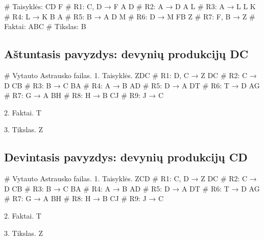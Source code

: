 \begin{pythonaienv}[fc]
# Taisyklės:
CD F                                    # R1: C, D → F
A D                                     # R2: A → D
A L                                     # R3: A → L
L K                                     # R4: L → K
B A                                     # R5: B → A
D M                                     # R6: D → M
FB Z                                    # R7: F, B → Z
# Faktai:
ABC
# Tikslas:
B
\end{pythonaienv}

\subsection{Aštuntasis pavyzdys: devynių produkcijų DC}

\begin{pythonaienv}[fc]
# Vytauto Astrausko failas.
1. Taisyklės.
ZDC                                     # R1: D, C → Z
DC                                      # R2: C → D
CB                                      # R3: B → C
BA                                      # R4: A → B
AD                                      # R5: D → A
DT                                      # R6: T → D
AG                                      # R7: G → A
BH                                      # R8: H → B
CJ                                      # R9: J → C

2. Faktai.
T

3. Tikslas.
Z
\end{pythonaienv}

\subsection{Devintasis pavyzdys: devynių produkcijų CD}

\begin{pythonaienv}[fc]
# Vytauto Astrausko failas.
1. Taisyklės.
ZCD                                     # R1: C, D → Z
DC                                      # R2: C → D
CB                                      # R3: B → C
BA                                      # R4: A → B
AD                                      # R5: D → A
DT                                      # R6: T → D
AG                                      # R7: G → A
BH                                      # R8: H → B
CJ                                      # R9: J → C

2. Faktai.
T

3. Tikslas.
Z
\end{pythonaienv}

